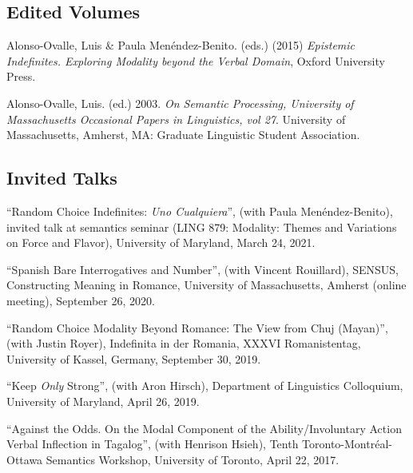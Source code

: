 \documentclass[11pt]{article}
\begin{document}

\subsection*{Edited Volumes}

Alonso-Ovalle, Luis \& Paula Men\'endez-Benito. (eds.) (2015) \emph{Epistemic Indefinites. Exploring Modality beyond the Verbal Domain}, Oxford University Press.

Alonso-Ovalle, Luis. (ed.) 2003. \emph{On Semantic Processing, University of Massachusetts Occasional Papers in Linguistics, vol 27}. University of Massachusetts, Amherst, MA: Graduate Linguistic Student Association.


\subsection*{Invited Talks}

``Random Choice Indefinites: \textit{Uno Cualquiera}'', (with Paula Men\'endez-Benito), invited talk at semantics seminar (LING 879: Modality: Themes and Variations on Force and Flavor), University of Maryland, March 24, 2021.

``Spanish Bare Interrogatives and Number'', (with Vincent Rouillard), SENSUS, Constructing Meaning in Romance, University of Massachusetts, Amherst (online meeting), September 26, 2020.

``Random Choice Modality Beyond Romance: The View from Chuj (Mayan)'', (with Justin Royer), Indefinita in der Romania, XXXVI Romanistentag, University of Kassel, Germany, September 30, 2019.

``Keep \textit{Only} Strong'', (with Aron Hirsch), Department of Linguistics Colloquium, University of Maryland, April 26, 2019.

``Against the Odds. On the Modal Component of the Ability/Involuntary Action Verbal Inflection in Tagalog'', (with Henrison Hsieh), Tenth Toronto-Montr\'eal-Ottawa Semantics Workshop, University of
Toronto, April 22, 2017.
\end{document}

